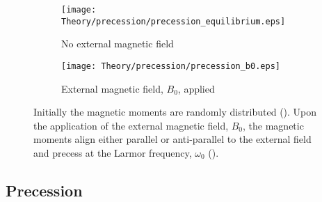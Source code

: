 \begin{figure}[H]
	\centering
	\begin{subfigure}[c]{0.47\textwidth}
		\centering
		\texttt{[image: Theory/precession/precession\_equilibrium.eps]}
		\caption{No external magnetic field}
		\label{fig:theory_precession_eq}
	\end{subfigure}
	\hfill
	\begin{subfigure}[c]{0.47\textwidth}
		\centering
		\texttt{[image: Theory/precession/precession\_b0.eps]}
		\caption{External magnetic field, $B_0$, applied}
		\label{fig:theory_precession_b0}
	\end{subfigure}
	\caption{Initially the magnetic moments are randomly distributed (). Upon the application of the external magnetic field, $B_0$, the magnetic moments align either parallel or anti-parallel to the external field and precess at the Larmor frequency, $\omega_0$ ().}
	\label{fig:theory_precession}
\end{figure}

\subsection{Precession}

